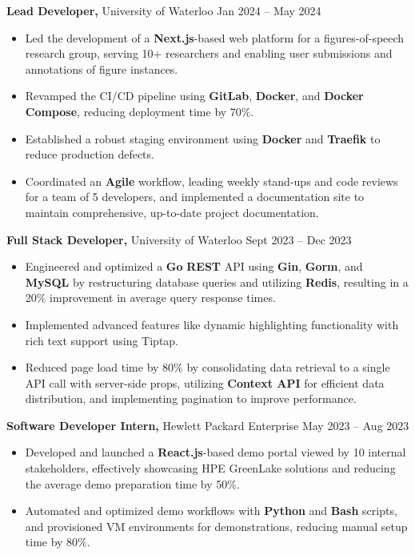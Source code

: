 \textbf{Lead Developer,} {University of Waterloo}  \hfill Jan 2024 -- May 2024 \\
\vspace{-9pt}
\begin{itemize}
  \item Led the development of a \textbf{Next.js}-based web platform for a figures-of-speech research group, serving 10+ researchers and enabling user submissions and annotations of figure instances.
  \item Revamped the CI/CD pipeline using \textbf{GitLab}, \textbf{Docker}, and \textbf{Docker Compose}, reducing deployment time by 70\%.
  \item Established a robust staging environment using \textbf{Docker} and \textbf{Traefik} to reduce production defects. 
  \item Coordinated an \textbf{Agile} workflow, leading weekly stand-ups and code reviews for a team of 5 developers, and implemented a documentation site to maintain comprehensive, up-to-date project documentation.
\end{itemize}

\textbf{Full Stack Developer,} {University of Waterloo}  \hfill Sept 2023 -- Dec 2023 \\
\vspace{-9pt}
\begin{itemize}
  \item Engineered and optimized a \textbf{Go} \textbf{REST} API using \textbf{Gin}, \textbf{Gorm}, and \textbf{MySQL} by restructuring database queries and utilizing \textbf{Redis}, resulting in a 20\% improvement in average query response times.
  \item Implemented advanced features like dynamic highlighting functionality with rich text support using Tiptap.
  \item Reduced page load time by 80\% by consolidating data retrieval to a single API call with server-side props, utilizing \textbf{Context API} for efficient data distribution, and implementing pagination to improve performance.
\end{itemize}

\textbf{Software Developer Intern,} {Hewlett Packard Enterprise}  \hfill May 2023 -- Aug 2023 \\
\vspace{-9pt}
\begin{itemize}
  \item Developed and launched a \textbf{React.js}-based demo portal viewed by 10 internal stakeholders, effectively showcasing HPE GreenLake solutions and reducing the average demo preparation time by 50\%.
  \item Automated and optimized demo workflows with \textbf{Python} and \textbf{Bash} scripts, and provisioned VM environments for demonstrations, reducing manual setup time by 80\%.
\end{itemize}

